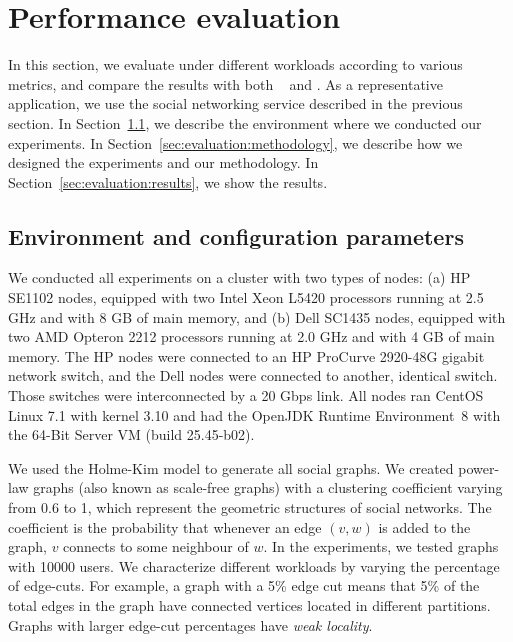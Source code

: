\section{Performance evaluation}
\label{sec:experiments}

In this section, we evaluate \dynastar{} under different workloads
according to various metrics, and compare the results with both
\ssmr{}~\cite{bezerra2014ssmr} and \dssmr. As a representative
application, we use the \appname{} social networking service described in the
previous section. In Section~\ref{sec:evaluation:setup}, we
describe the environment where we conducted our experiments.  In
Section~\ref{sec:evaluation:methodology}, we describe how we designed
the experiments and our methodology.  In
Section~\ref{sec:evaluation:results}, we show the results.

\subsection{Environment and configuration parameters}
\label{sec:evaluation:setup}

We conducted all experiments on a cluster with two types of nodes: (a)
HP SE1102 nodes, equipped with two Intel Xeon L5420 processors running
at 2.5 GHz and with 8 GB of main memory, and (b) Dell SC1435 nodes,
equipped with two AMD Opteron 2212 processors running at 2.0 GHz and
with 4 GB of main memory. The HP nodes were connected to an HP
ProCurve 2920-48G gigabit network switch, and the Dell nodes were
connected to another, identical switch. Those switches were
interconnected by a 20 Gbps link.  All nodes ran CentOS Linux 7.1 with
kernel 3.10 and had the OpenJDK Runtime Environment~8 with the
\mbox{64-Bit} Server VM (build 25.45-b02).

We used the Holme-Kim model \cite{holme-kim} to generate all social
graphs.  We created power-law graphs (also known as scale-free graphs)
with a clustering coefficient varying from 0.6 to 1, which represent the geometric
structures of social networks. The coefficient is the probability that whenever an edge 
$(v, w)$ is added to the graph, $v$ connects to some neighbour of $w$.
In the experiments, we tested graphs with 10000 users. We characterize 
different workloads by varying the percentage of edge-cuts.
For example, a graph with a 5\% edge cut means that 5\% of the total edges
in the graph have connected vertices located in different partitions.
Graphs with larger edge-cut percentages have \emph{weak locality}.

